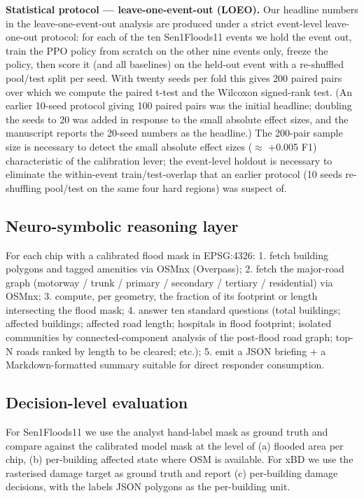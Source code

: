 \documentclass[sn-nature,lineno]{sn-jnl}
\theoremstyle{thmstyleone}
\theoremstyle{thmstyletwo}
\theoremstyle{thmstylethree}
\begin{document}
\textbf{Statistical protocol --- leave-one-event-out (LOEO).} Our headline numbers
in the leave-one-event-out analysis are produced under a strict event-level leave-one-out protocol: for
each of the ten Sen1Floods11 events we hold the event out, train the PPO
policy from scratch on the other nine events only, freeze the policy, then
score it (and all baselines) on the held-out event with a re-shuffled
pool/test split per seed. With twenty seeds per fold this gives 200
paired pairs over which we compute the paired t-test and the Wilcoxon
signed-rank test. (An earlier 10-seed protocol giving 100 paired pairs
was the initial headline; doubling the seeds to 20 was added in
response to the small absolute effect sizes, and the manuscript reports
the 20-seed numbers as the headline.) The 200-pair sample size is
necessary to detect the small absolute
effect sizes ($\approx$ +0.005 F1) characteristic of the calibration lever; the
event-level holdout is necessary to eliminate the within-event
train/test-overlap that an earlier protocol (10 seeds re-shuffling
pool/test on the same four hard regions) was suspect of.

\subsection{Neuro-symbolic reasoning layer}\label{neuro-symbolic-reasoning-layer}

For each chip with a calibrated flood mask in EPSG:4326:
1. fetch building polygons and tagged amenities via OSMnx (Overpass);
2. fetch the major-road graph (motorway / trunk / primary / secondary /
tertiary / residential) via OSMnx;
3. compute, per geometry, the fraction of its footprint or length intersecting
the flood mask;
4. answer ten standard questions (total buildings; affected buildings; affected
road length; hospitals in flood footprint; isolated communities by
connected-component analysis of the post-flood road graph; top-N roads
ranked by length to be cleared; etc.);
5. emit a JSON briefing + a Markdown-formatted summary suitable for direct
responder consumption.

\subsection{Decision-level evaluation}\label{decision-level-evaluation}

For Sen1Floods11 we use the analyst hand-label mask as ground truth and
compare against the calibrated model mask at the level of (a) flooded area
per chip, (b) per-building affected state where OSM is available. For xBD
we use the rasterised damage target as ground truth and report (c)
per-building damage decisions, with the labels JSON polygons as the
per-building unit.
\end{document}
